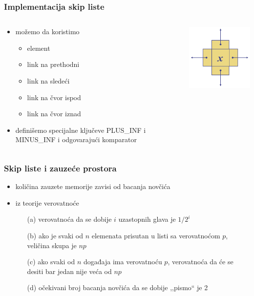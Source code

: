 \documentclass[compress,aspectratio=169]{beamer}
\begin{document}
\begin{frame}[fragile]
  \frametitle{Implementacija skip liste}
  \begin{columns}
    \begin{column}[c]{6cm}
      \begin{itemize}
        \item možemo da koristimo 
        \begin{itemize}
          \item element
          \item link na prethodni
          \item link na sledeći
          \item link na čvor ispod
          \item link na čvor iznad
        \end{itemize}
        \item definišemo specijalne ključeve {\tiny PLUS\_INF} i {\tiny MINUS\_INF} i odgovarajući komparator 
      \end{itemize}
    \end{column}
    \begin{column}[c]{6cm}
      \begin{center}
        \includegraphics[width=5cm]{asp-10-pic15.png}
      \end{center}
    \end{column}
  \end{columns}
\end{frame}

\begin{frame}[fragile]
  \frametitle{Skip liste i zauzeće prostora}
  \begin{itemize}
    \item količina zauzete memorije zavisi od bacanja novčića
    \item iz teorije verovatnoće
    \begin{itemize}
      \item[(a)] verovatnoća da se dobije $i$ uzastopnih glava je $1/2^i$
      \item[(b)] ako je svaki od $n$ elemenata prisutan u listi sa verovatnoćom $p$, veličina skupa je $np$
      \item[(c)] ako svaki od $n$ događaja ima verovatnoću $p$, verovatnoća da će se desiti bar jedan nije veća od $np$
      \item[(d)] očekivani broj bacanja novčića da se dobije ,,pismo`` je 2
    \end{itemize}
  \end{itemize}
\end{frame}
\end{document}
